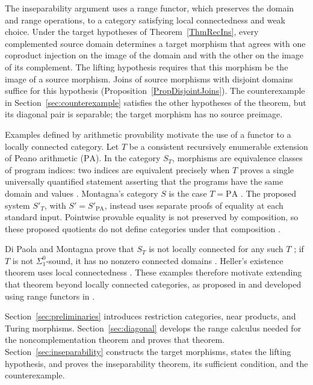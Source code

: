 \documentclass[letterpaper,10pt]{amsart}
\theoremstyle{plain}
\theoremstyle{definition}
\begin{document}
The inseparability argument uses a range functor, which preserves the
domain and range operations, to a category satisfying local
connectedness and weak choice. Under the target hypotheses of
Theorem~\ref{ThmRecIns}, every complemented source domain determines a
target morphism that agrees with one coproduct injection on the image
of the domain and with the other on the image of its complement.
The lifting hypothesis requires that this morphism
be the image of a source morphism. Joins of source morphisms with
disjoint domains suffice for this hypothesis
(Proposition~\ref{PropDisjointJoins}). The counterexample in
Section~\ref{sec:counterexample} satisfies the other hypotheses of the
theorem, but its diagonal pair is separable; the target morphism has
no source preimage.

Examples defined by arithmetic provability motivate the use of a
functor to a locally connected category. Let $T$ be a consistent
recursively enumerable extension of Peano arithmetic ($\mathrm{PA}$).
In the category $S_T$, morphisms are equivalence classes of program
indices: two indices are equivalent precisely when $T$ proves a single
universally quantified statement asserting that the programs have the
same domain and values \cite[p.~646]{MR93b:03103}. Montagna's category
$S$ is the case $T=\mathrm{PA}$ \cite[p.~105]{MR90i:03046}.
The proposed system $S'_T$, with $S'=S'_{\mathrm{PA}}$, instead uses
separate proofs of equality at each standard input. Pointwise provable
equality is not preserved by composition, so these proposed quotients
do not define categories under that composition
\cite[Corollary~2]{leng2026composition}.

Di Paola and Montagna prove that $S_T$ is not locally connected for
any such $T$ \cite[Corollary~4.4]{MR93b:03103}; if $T$ is not
$\Sigma^0_1$-sound, it has no nonzero connected domains
\cite[Theorem~4.3(2)]{MR93b:03103}. Heller's existence theorem uses
local connectedness \cite{MR92e:03067}. These examples therefore
motivate extending that theorem beyond locally connected categories,
as proposed in \cite{MR93b:03103} and developed using range functors
in \cite{leng}.

Section~\ref{sec:preliminaries} introduces restriction categories,
near products, and Turing morphisms. Section~\ref{sec:diagonal}
develops the range calculus needed for the noncomplementation theorem
and proves that theorem. Section~\ref{sec:inseparability} constructs
the target morphisms, states the lifting hypothesis, and proves the
inseparability theorem, its sufficient condition, and the counterexample.
\end{document}
